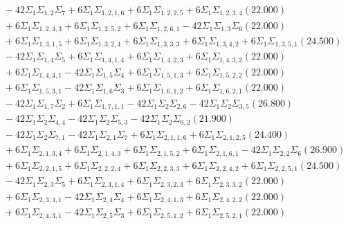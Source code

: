 \documentclass[12pt]{article}
\begin{document}
\begin{landscape}
\begin{align*}
		&\quad\quad -42\Sigma_{1}\Sigma_{1,2}\Sigma_{7}+6\Sigma_{1}\Sigma_{1,2,1,6}+6\Sigma_{1}\Sigma_{1,2,2,5}+6\Sigma_{1}\Sigma_{1,2,3,4}(22.000) \\ 
		&\quad\quad +6\Sigma_{1}\Sigma_{1,2,4,3}+6\Sigma_{1}\Sigma_{1,2,5,2}+6\Sigma_{1}\Sigma_{1,2,6,1}-42\Sigma_{1}\Sigma_{1,3}\Sigma_{6}(22.000) \\ 
		&\quad\quad +6\Sigma_{1}\Sigma_{1,3,1,5}+6\Sigma_{1}\Sigma_{1,3,2,4}+6\Sigma_{1}\Sigma_{1,3,3,3}+6\Sigma_{1}\Sigma_{1,3,4,2}+6\Sigma_{1}\Sigma_{1,3,5,1}(24.500) \\ 
		&\quad\quad -42\Sigma_{1}\Sigma_{1,4}\Sigma_{5}+6\Sigma_{1}\Sigma_{1,4,1,4}+6\Sigma_{1}\Sigma_{1,4,2,3}+6\Sigma_{1}\Sigma_{1,4,3,2}(22.000) \\ 
		&\quad\quad +6\Sigma_{1}\Sigma_{1,4,4,1}-42\Sigma_{1}\Sigma_{1,5}\Sigma_{4}+6\Sigma_{1}\Sigma_{1,5,1,3}+6\Sigma_{1}\Sigma_{1,5,2,2}(22.000) \\ 
		&\quad\quad +6\Sigma_{1}\Sigma_{1,5,3,1}-42\Sigma_{1}\Sigma_{1,6}\Sigma_{3}+6\Sigma_{1}\Sigma_{1,6,1,2}+6\Sigma_{1}\Sigma_{1,6,2,1}(22.000) \\ 
		&\quad\quad -42\Sigma_{1}\Sigma_{1,7}\Sigma_{2}+6\Sigma_{1}\Sigma_{1,7,1,1}-42\Sigma_{1}\Sigma_{2}\Sigma_{2,6}-42\Sigma_{1}\Sigma_{2}\Sigma_{3,5}(26.800) \\ 
		&\quad\quad -42\Sigma_{1}\Sigma_{2}\Sigma_{4,4}-42\Sigma_{1}\Sigma_{2}\Sigma_{5,3}-42\Sigma_{1}\Sigma_{2}\Sigma_{6,2}(21.900) \\ 
		&\quad\quad -42\Sigma_{1}\Sigma_{2}\Sigma_{7,1}-42\Sigma_{1}\Sigma_{2,1}\Sigma_{7}+6\Sigma_{1}\Sigma_{2,1,1,6}+6\Sigma_{1}\Sigma_{2,1,2,5}(24.400) \\ 
		&\quad\quad +6\Sigma_{1}\Sigma_{2,1,3,4}+6\Sigma_{1}\Sigma_{2,1,4,3}+6\Sigma_{1}\Sigma_{2,1,5,2}+6\Sigma_{1}\Sigma_{2,1,6,1}-42\Sigma_{1}\Sigma_{2,2}\Sigma_{6}(26.900) \\ 
		&\quad\quad +6\Sigma_{1}\Sigma_{2,2,1,5}+6\Sigma_{1}\Sigma_{2,2,2,4}+6\Sigma_{1}\Sigma_{2,2,3,3}+6\Sigma_{1}\Sigma_{2,2,4,2}+6\Sigma_{1}\Sigma_{2,2,5,1}(24.500) \\ 
		&\quad\quad -42\Sigma_{1}\Sigma_{2,3}\Sigma_{5}+6\Sigma_{1}\Sigma_{2,3,1,4}+6\Sigma_{1}\Sigma_{2,3,2,3}+6\Sigma_{1}\Sigma_{2,3,3,2}(22.000) \\ 
		&\quad\quad +6\Sigma_{1}\Sigma_{2,3,4,1}-42\Sigma_{1}\Sigma_{2,4}\Sigma_{4}+6\Sigma_{1}\Sigma_{2,4,1,3}+6\Sigma_{1}\Sigma_{2,4,2,2}(22.000) \\ 
		&\quad\quad +6\Sigma_{1}\Sigma_{2,4,3,1}-42\Sigma_{1}\Sigma_{2,5}\Sigma_{3}+6\Sigma_{1}\Sigma_{2,5,1,2}+6\Sigma_{1}\Sigma_{2,5,2,1}(22.000) \\ 

\end{align*}
\end{landscape}
\end{document}
